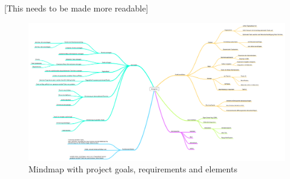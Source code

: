 [This needs to be made more readable]

\begin{figure}[h!]
\centering
\includegraphics[width=16cm]{pics/kangaroo.png}
\caption{Mindmap with project goals, requirements and elements}
\label{mindmap}
\end{figure}